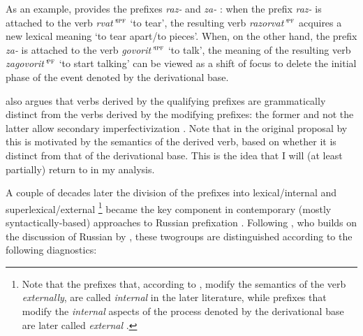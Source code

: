 As an example, \citet{Isachenko:60} provides the prefixes \textit{raz-}   and \textit{za-}  : when the prefix \textit{raz-}   is attached to the verb \textit{rvat'}$^{\textsc{ipf}}$ `to tear', the resulting verb \textit{razorvat'}$^{\textsc{pf}}$ acquires a new lexical meaning `to tear apart/to pieces'. When, on the other hand, the prefix \textit{za-}   is attached to the verb \textit{govorit'}$^{\textsc{ipf}}$ `to talk', the meaning of the resulting verb \textit{zagovorit'}$^{\textsc{pf}}$ `to start talking' can be viewed as a shift of focus to delete the initial phase of the event denoted by the derivational base.

\citet{Isachenko:60} also argues that verbs derived by the qualifying prefixes are grammatically distinct from the verbs derived by the modifying prefixes: the former and not the latter allow secondary imperfectivization . Note that in the original proposal by \citet{Isachenko:60} this is motivated by the semantics of the derived verb, based on whether it is distinct from that of the derivational base. This is the idea that I will (at least partially) return to in my analysis.

A couple of decades later the division of the prefixes into lexical\slash internal  and superlexical\slash external \footnote{Note that the prefixes that, according to \citet{Isachenko:60}, modify the semantics of the verb \textit{externally}, are called \textit{internal}  in the later literature, while prefixes that modify the \textit{internal} aspects of the process denoted by the derivational base are later called \textit{external }.} became the key component in contemporary (mostly syn\-tac\-tically-based) approaches to Russian prefixation  \citep{Schoorlemmer:95, Babko-Malaya:99, Borik:02, Gehrke:04, Ramchand:04, Romanova:04, Romanova:06, Svenonius:04a, Svenonius:04b, DiSciullo:05}. Following \citet[229]{Svenonius:04b}, who builds on the discussion of Russian by \citet{Schoorlemmer:95}, these two\linebreak groups are distinguished according to the following diagnostics:

